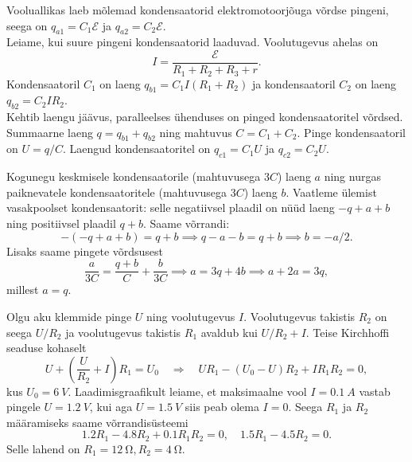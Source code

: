 \documentclass[10pt, twoside]{article}
\begin{document}
{%

\solu
\osa Vooluallikas laeb mõlemad kondensaatorid elektromotoorjõuga võrdse pingeni, seega on $q_{a1} = C_1\mathcal E$ ja $q_{a2} = C_2\mathcal E$.\\
\osa Leiame, kui suure pingeni kondensaatorid laaduvad. Voolutugevus ahelas
on
\[
I = \frac{\mathcal E}{R_1+R_2+R_3+r}.
\]
Kondensaatoril $C_1$ on laeng $q_{b1} = C_1I(R_1 + R_2)$ ja kondensaatoril $C_2$ on laeng $q_{b2} = C_2IR_2$.\\
\osa Kehtib laengu jäävus, paralleelses ühenduses on pinged kondensaatoritel võrdsed. Summaarne laeng $q = q_{b1} + q_{b2}$ ning mahtuvus $C = C_1 + C_2$. Pinge kondensaatoril on $U = q/C$. Laengud kondensaatoritel on $q_{c1} = C_1U$ ja $q_{c2} = C_2U$.
\probend
\bigskip


\solu
Kogunegu keskmisele kondensaatorile (mahtuvusega $3C$) laeng $a$ ning nurgas paiknevatele kondensaatoritele (mahtuvusega $3C$) laeng $b$. Vaatleme ülemist vasakpoolset kondensaatorit: selle negatiivsel plaadil on nüüd laeng $-q+a+b$ ning positiivsel plaadil $q+b$. Saame võrrandi:
\[-(-q+a+b)=q+b \implies q-a-b=q+b \implies b=-a/2.\]
Lisaks saame pingete võrdsusest
\[\frac{a}{3C}=\frac{q+b}{C}+\frac{b}{3C}\implies a=3q+4b\implies a+2a=3q,\]
millest $a=q$.
\probend
\bigskip


\solu
Olgu aku klemmide pinge $U$ ning voolutugevus $I$. Voolutugevus takistis $R_2$ on seega $U/R_2$ ja voolutugevus takistis $R_1$ avaldub kui $U/R_2 + I$. Teise Kirchhoffi seaduse kohaselt 
\[
U+\left(\frac{U}{R_{2}}+I\right) R_{1}=U_{0} \quad \Rightarrow \quad U R_{1}-\left(U_{0}-U\right) R_{2}+I R_{1} R_{2}=0,
\]
kus $U_0 = \SI{6}{V}$. Laadimisgraafikult leiame, et maksimaalne vool $I = \SI{0,1}{A}$ vastab pingele $U = \SI{1,2}{V}$, kui aga $U = \SI{1,5}{V}$ siis peab olema $I = 0$. Seega $R_1$ ja $R_2$ määramiseks saame võrrandisüsteemi 
\[
\num{1,2}R_1 - \num{4,8}R_2 + \num{0,1}R_1R_2 = 0, \quad \num{1,5}R_1 - \num{4,5}R_2 = 0. 
\]
Selle lahend on $R_1 = \SI{12}{\ohm}, R_2 = \SI{4}{\ohm}$.
\probend
\bigskip

}
\end{document}
